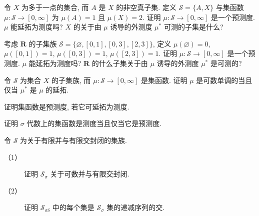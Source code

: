 \documentclass[../../main.tex]{subfiles}
\begin{document}
\begin{exercise}\label{exercise:ch17-25}
令 $X$ 为多于一点的集合, 而 $A$ 是 $X$ 的非空真子集. 定义 $\mathcal{S}=\{A,X\}$ 与集函数 $\mu:\mathcal{S}\to[0,\infty]$ 为 $\mu(A)=1$ 且 $\mu(X)=2$. 证明 $\mu:\mathcal{S}\to[0,\infty]$ 是一个预测度. $\mu$ 能延拓为测度吗? $X$ 的关于由 $\mu$ 诱导的外测度 $\mu^*$ 可测的子集是什么?
\end{exercise}

\begin{exercise}\label{exercise:ch17-26}
考虑 $\mathbf{R}$ 的子集族 $\mathcal{S}=\{\varnothing,[0,1],[0,3],[2,3]\}$, 定义 $\mu(\varnothing)=0$, $\mu([0,1])=1$, $\mu([0,3])=1$, $\mu([2,3])=1$. 证明 $\mu:\mathcal{S}\to[0,\infty]$ 是一个预测度. $\mu$ 能延拓为测度吗? $\mathbf{R}$ 的什么子集关于由 $\mu$ 诱导的外测度 $\mu^*$ 是可测的?
\end{exercise}

\begin{exercise}\label{exercise:ch17-27}
令 $\mathcal{S}$ 为集合 $X$ 的子集族, 而 $\mu:\mathcal{S}\to[0,\infty]$ 是集函数. 证明 $\mu$ 是可数单调的当且仅当 $\mu^*$ 是 $\mu$ 的延拓.
\end{exercise}

\begin{exercise}\label{exercise:ch17-28}
证明集函数是预测度, 若它可延拓为测度.
\end{exercise}

\begin{exercise}\label{exercise:ch17-29}
证明 $\sigma$ 代数上的集函数是测度当且仅当它是预测度.
\end{exercise}

\begin{exercise}\label{exercise:ch17-30}
令 $\mathcal{S}$ 为关于有限并与有限交封闭的集族.
\begin{description}
\item[（1）] 证明 $\mathcal{S}_{\sigma}$ 关于可数并与有限交封闭.
\item[（2）] 证明 $\mathcal{S}_{\sigma\delta}$ 中的每个集是 $\mathcal{S}_{\sigma}$ 集的递减序列的交.
\end{description}
\end{exercise}
\end{document}
